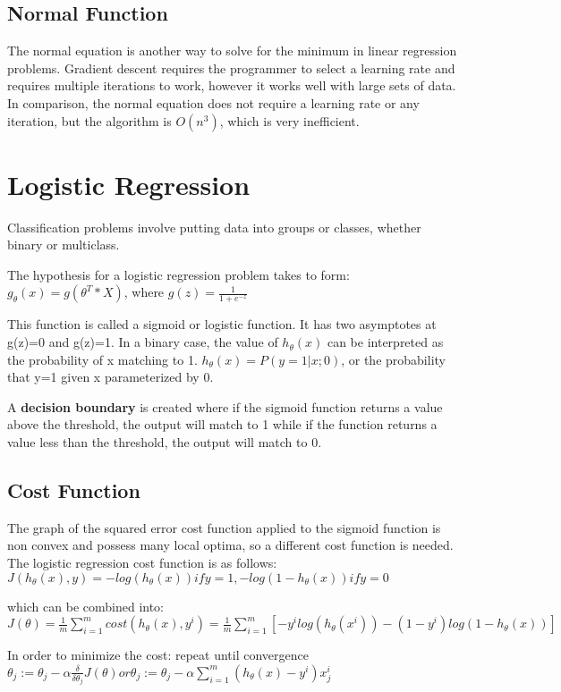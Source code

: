 \documentclass[12pt, twoside, a4paper]{book}
\begin{document}
\section{Normal Function}
The normal equation is another way to solve for the minimum in linear regression problems. Gradient descent requires the programmer to select a learning rate and requires multiple iterations to work, however it works well with large sets of data. In comparison, the normal equation does not require a learning rate or any iteration, but the algorithm is $O(n^3)$, which is very inefficient.

\chapter{Logistic Regression}
Classification problems involve putting data into groups or classes, whether binary or multiclass.

The hypothesis for a logistic regression problem takes to form:\newline
$g_\theta(x) = g(\theta^T*X)$, where $g(z)=\frac{1}{1+e^{-z}}$

This function is called a sigmoid or logistic function. It has two asymptotes at g(z)=0 and g(z)=1. In a binary case, the value of $h_\theta(x)$ can be interpreted as the probability of x matching to 1. $h_\theta(x)=P(y=1|x;0)$, or the probability that y=1 given x parameterized by 0.

A \textbf{decision boundary} is created where if the sigmoid function returns a value above the threshold, the output will match to 1 while if the function returns a value less than the threshold, the output will match to 0.

\section{Cost Function}
The graph of the squared error cost function applied to the sigmoid function is non convex and possess many local optima, so a different cost function is needed. The logistic regression cost function is as follows:\newline
$J(h_\theta(x),y) = -log(h_\theta(x)) if y=1, -log(1-h_\theta(x)) if y=0$

which can be combined into:\newline
$J(\theta) = \frac{1}{m}\sum\limits_{i=1}^mcost(h_\theta(x),y^i)=\frac{1}{m}\sum\limits_{i=1}^m[-y^ilog(h_\theta(x^i))-(1-y^i)log(1-h_\theta(x))]$

In order to minimize the cost:
repeat until convergence $\theta_j := \theta_j-\alpha\frac{\delta}{\delta\theta_j}J(\theta) or \theta_j := \theta_j-\alpha\sum\limits_{i=1}^m(h_\theta(x)-y^i)x_j^i$
\end{document}

